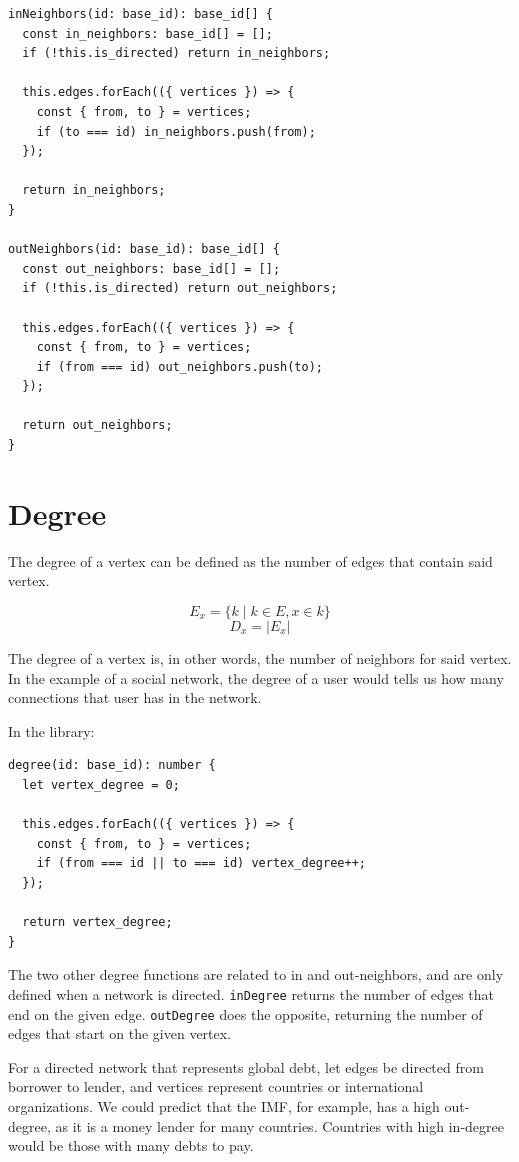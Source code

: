 \begin{verbatim}
inNeighbors(id: base_id): base_id[] {
  const in_neighbors: base_id[] = [];
  if (!this.is_directed) return in_neighbors;

  this.edges.forEach(({ vertices }) => {
    const { from, to } = vertices;
    if (to === id) in_neighbors.push(from);
  });

  return in_neighbors;
}

outNeighbors(id: base_id): base_id[] {
  const out_neighbors: base_id[] = [];
  if (!this.is_directed) return out_neighbors;

  this.edges.forEach(({ vertices }) => {
    const { from, to } = vertices;
    if (from === id) out_neighbors.push(to);
  });

  return out_neighbors;
}
\end{verbatim}

\section{Degree}

The degree of a vertex can be defined as the number of edges that contain said vertex.

$$E_x=\{k \mid k \in E, x \in k\}$$
$$D_x=|E_x|$$

The degree of a vertex is, in other words, the number of neighbors for said vertex.
In the example of a social network, the degree of a user would
tells us how many connections that user has in the network.

In the library:

\begin{verbatim}
degree(id: base_id): number {
  let vertex_degree = 0;

  this.edges.forEach(({ vertices }) => {
    const { from, to } = vertices;
    if (from === id || to === id) vertex_degree++;
  });

  return vertex_degree;
}
\end{verbatim}

The two other degree functions are related to in and out-neighbors,
and are only defined when a network is directed.
\texttt{inDegree} returns the number of edges that end on the given edge.
\texttt{outDegree} does the opposite,
returning the number of edges that start on the given vertex.

For a directed network that represents global debt,
let edges be directed from borrower to lender, and vertices
represent countries or international organizations.
We could predict that the IMF, for example, has a high out-degree,
as it is a money lender for many countries.
Countries with high in-degree would be those with many debts to pay.

